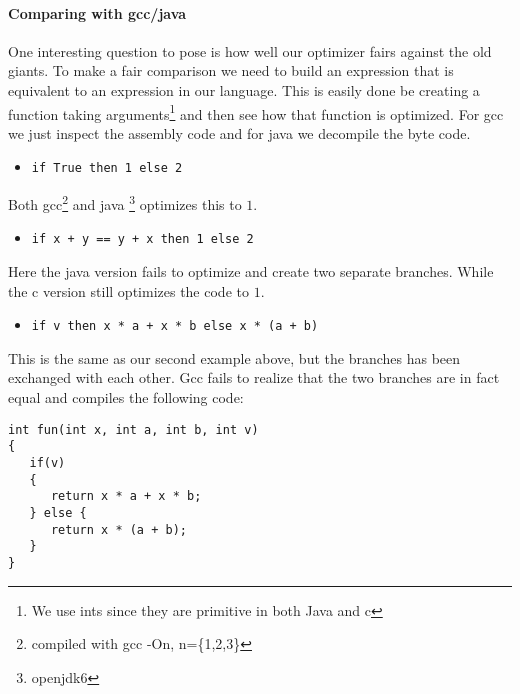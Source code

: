 \paragraph{Comparing with gcc/java}
One interesting question to pose is how well our optimizer fairs against the old giants.
To make a fair comparison we need to build an expression that is equivalent to an expression in our language. This is easily done be creating a function taking arguments\footnote{We use ints since they are primitive in both Java and c} and then see how that function is optimized. For gcc we just inspect the assembly code and for java we decompile the byte code.
\begin{itemize}
  \item \verb|if True then 1 else 2|
\end{itemize}
Both gcc\footnote{compiled with gcc -On, n=\{1,2,3\}} and java \footnote{openjdk6} optimizes this to $1$.

\begin{itemize}
  \item \verb|if x + y == y + x then 1 else 2|
\end{itemize}
Here the java version fails to optimize and create two separate branches. While the c version still optimizes the code to $1$.
\begin{itemize}
  \item \verb|if v then x * a + x * b else x * (a + b)|
\end{itemize}
This is the same as our second example above, but the branches has been exchanged with each other.
Gcc fails to realize that the two branches are in fact equal and compiles the following code: 
\begin{verbatim}
int fun(int x, int a, int b, int v)                                                         {                                                                                    
   if(v)
   {                                                                     
      return x * a + x * b;                                                        
   } else {                                                                         
      return x * (a + b);                                                          
   }
}
\end{verbatim}

